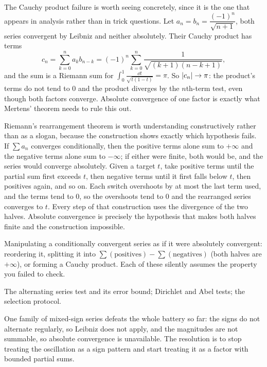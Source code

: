 The Cauchy product failure is worth seeing concretely, since it is the one that appears in analysis rather than in trick questions. Let $a_n=b_n=\dfrac{(-1)^{n}}{\sqrt{n+1}}$, both series convergent by Leibniz and neither absolutely. Their Cauchy product has terms
\[c_n=\sum_{k=0}^{n}a_kb_{n-k}=(-1)^{n}\sum_{k=0}^{n}\frac{1}{\sqrt{(k+1)(n-k+1)}},\]
and the sum is a Riemann sum for $\displaystyle\int_0^1\frac{\dd t}{\sqrt{t(1-t)}}=\pi$. So $\left\lvert c_n\right\rvert\to\pi$: the product's terms do not tend to $0$ and the product diverges by the $n$th-term test, even though both factors converge. Absolute convergence of one factor is exactly what Mertens' theorem needs to rule this out.

Riemann's rearrangement theorem is worth understanding constructively rather than as a slogan, because the construction shows exactly which hypothesis fails. If $\sum a_n$ converges conditionally, then the positive terms alone sum to $+\infty$ and the negative terms alone sum to $-\infty$; if either were finite, both would be, and the series would converge absolutely. Given a target $t$, take positive terms until the partial sum first exceeds $t$, then negative terms until it first falls below $t$, then positives again, and so on. Each switch overshoots by at most the last term used, and the terms tend to $0$, so the overshoots tend to $0$ and the rearranged series converges to $t$. Every step of that construction uses the divergence of the two halves. Absolute convergence is precisely the hypothesis that makes both halves finite and the construction impossible.

\begin{trap}
Manipulating a conditionally convergent series as if it were absolutely convergent: reordering it, splitting it into $\sum(\text{positives})-\sum(\text{negatives})$ (both halves are $+\infty$), or forming a Cauchy product. Each of these silently assumes the property you failed to check.
\end{trap}

\begin{seealsob}The alternating series test and its error bound; Dirichlet and Abel tests; the selection protocol.\end{seealsob}

One family of mixed-sign series defeats the whole battery so far: the signs do not alternate regularly, so Leibniz does not apply, and the magnitudes are not summable, so absolute convergence is unavailable. The resolution is to stop treating the oscillation as a sign pattern and start treating it as a factor with bounded partial sums.

